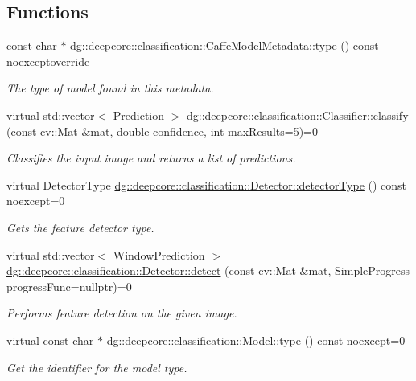 \subsection*{Functions}
\begin{DoxyCompactItemize}
\item 
const char $\ast$ \hyperlink{group___classification_module_ga8681b7b38c886f71e1f680501088cf89}{dg\+::deepcore\+::classification\+::\+Caffe\+Model\+Metadata\+::type} () const noexceptoverride
\begin{DoxyCompactList}\small\item\em The type of model found in this metadata. \end{DoxyCompactList}\item 
virtual std\+::vector$<$ Prediction $>$ \hyperlink{group___classification_module_ga4485a5f0dd8fc0b63fb56284ce5a5705}{dg\+::deepcore\+::classification\+::\+Classifier\+::classify} (const cv\+::\+Mat \&mat, double confidence, int max\+Results=5)=0
\begin{DoxyCompactList}\small\item\em Classifies the input image and returns a list of predictions. \end{DoxyCompactList}\item 
virtual Detector\+Type \hyperlink{group___classification_module_ga6f82560e3b0c2886e919f2e76e766838}{dg\+::deepcore\+::classification\+::\+Detector\+::detector\+Type} () const noexcept=0
\begin{DoxyCompactList}\small\item\em Gets the feature detector type. \end{DoxyCompactList}\item 
virtual std\+::vector$<$ Window\+Prediction $>$ \hyperlink{group___classification_module_gac09a9197de6732069e40b0e3bcbdf94c}{dg\+::deepcore\+::classification\+::\+Detector\+::detect} (const cv\+::\+Mat \&mat, Simple\+Progress progress\+Func=nullptr)=0
\begin{DoxyCompactList}\small\item\em Performs feature detection on the given image. \end{DoxyCompactList}\item 
virtual const char $\ast$ \hyperlink{group___classification_module_gaf5f12d2050c32035c1b9a038ec61d618}{dg\+::deepcore\+::classification\+::\+Model\+::type} () const noexcept=0
\begin{DoxyCompactList}\small\item\em Get the identifier for the model type. \end{DoxyCompactList}\item 

\end{DoxyCompactItemize}
